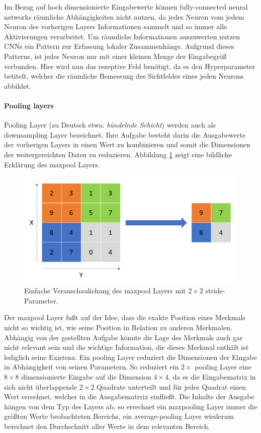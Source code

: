Im Bezug auf hoch dimensionierte Eingabewerte k\"onnen fully-connected neural networks r\"aumliche Abh\"angigkeiten nicht nutzen, da jedes Neuron vom jedem Neuron des vorherigen Layers Informationen sammelt und so immer alle Aktivierungen verarbeitet. Um r\"aumliche Informationen auszuwerten nutzen CNNs ein Pattern zur Erfassung lokaler Zusammenhänge. Aufgrund dieses Patterns, ist jedes Neuron nur mit einer kleinen Menge der Eingabegr\"o\ss{} verbunden. Hier wird nun das rezeptive Feld ben\"otigt, da es den Hyperparameter betitelt, welcher die r\"aumliche Bemessung des Sichtfeldes eines jeden Neurons abbildet.

\paragraph{Pooling layers}

Pooling Layer (zu Deutsch etwa: \textit{bündelnde Schicht}) werden auch als downsampling Layer bezeichnet. Ihre Aufgabe besteht darin die Ausgabewerte der vorherigen Layers in einen Wert zu kombinieren und somit die Dimensionen der weitergereichten Daten zu reduzieren. Abbildung \ref{fig:maxpool} zeigt eine bildliche Erkl\"arung des maxpool Layers.

\begin{figure}[H]
\centering
\includegraphics[scale=0.45]{pictures/grafiken/grafikenmax}
\caption[Caption for LOF]{Einfache Veranschaulichung des maxpool Layers mit $2 \times 2$ stride-Parameter.}
\label{fig:maxpool}

\end{figure}

Der maxpool Layer fu\ss{}t auf der Idee, dass die exakte Position eines Merkmals nicht so wichtig ist, wie seine Position in Relation zu anderen Merkmalen. Abh\"angig von der gestellten Aufgabe k\"onnte die Lage des Merkmals auch gar nicht relevant sein und die wichtige Information, die dieses Merkmal enth\"alt ist lediglich seine Existenz. Ein pooling Layer reduziert die Dimensionen der Eingabe in Abh\"angigkeit von seinen Parametern. So reduziert ein $2\times$ pooling Layer eine $8\times8$ dimensionierte Eingabe auf die Dimension $4\times4$, da es die Eingabematrix in sich nicht \"uberlappende $2\times2$ Quadrate unterteilt und f\"ur jedes Quadrat einen Wert errechnet, welcher in die Ausgabematrrix einflie\ss{}t. Die Inhalte der Ausgabe h\"angen von dem Typ des Layers ab, so errechnet ein maxpooling Layer immer die gr\"o\ss{}ten Werte beobachteten Bereichs, ein average-pooling Layer wiederum berechnet den Durchschnitt aller Werte in dem relevanten Bereich.

